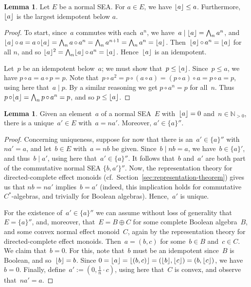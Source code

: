 \documentclass[a4paper, onecolumn, accepted=2020-12-22]{quantumarticle}
\DeclarePairedDelimiter{\floor}{\lfloor}{\rfloor}
\newcommand{\N}{\mathbb{N}}
\newcommand{\mult}{\mathop{\circ}}
\newcommand{\commu}{\mathrel{\lvert}}
\newcounter{counter}
\theoremstyle{definition}
\newtheorem{lemma}[counter]{Lemma}
\begin{document}
\begin{lemma}
    Let $E$ be a normal SEA. For $a\in E$, we have $\floor{a} \leq a$. Furthermore, $\floor{a}$ is the largest idempotent below $a$.
\end{lemma}
\begin{proof}
  To start, 
  since~$a$ commutes with each~$a^n$,
  we have~$a \commu  \floor{a} = \bigwedge_n a^n$,
  and $\floor{a}\mult a = a\mult \floor{a} = \bigwedge_n a\mult a^n 
  = \bigwedge_n a^{n+1}
    = \bigwedge_n a^n = \floor{a}$.
Then~$\floor{a}\mult a^n = \floor{a}$ for all $n$,
  and so $\floor{a}^2 = \bigwedge_n \floor{a} \mult a^n = \floor{a}$.
Hence~$\floor{a}$ is an idempotent.

Let~$p$ be an idempotent below~$a$;  we must show that~$p\leq \floor{a}$.
Since~$p\leq a$, we have $p\mult a = a\mult p=  p$.
Note that~$p\mult a^2 = p\mult(a\mult a)=(p\mult a)\mult a=p\mult a=p$,
using here that~$a\commu p$. By a similar reasoning
we get $p\mult a^n =p$ for all~$n$.
  Thus~$p\mult \floor{a} = \bigwedge_n p\mult a^n 
	= p$, and so $p\leq \floor{a}$.
\end{proof}

\begin{lemma}\label{lem:uniquedivision}
Given an element~$a$ of a normal SEA~$E$ with~$\floor{a}=0$
and~$n\in \N_{>0}$,
there is a unique~$a'\in E$ with~$a=na'$.
  Moreover, $a'\in \{a\}''$.
\end{lemma}
\begin{proof}
Concerning uniqueness, suppose for now that there is an~$a'\in \{a\}''$
with~$na'=a$, and let~$b\in E$ with~$a=nb$ be given.
Since~$b\commu nb=a$, we have~$b\in \{a\}'$,
  and thus~$b\commu a'$, using here that~$a'\in \{a\}''$.
It follows that~$b$ and~$a'$ are both part
  of the commutative normal SEA  $\{b,a'\}''$.
Now,
the representation theory for directed-complete effect monoids
(cf.~Section~\ref{sec:representation-theorem})
gives us that
  $nb=na'$ implies~$b=a'$ (indeed, this implication
  holds for commutative $C^*$-algebras,
  and trivially for Boolean algebras). Hence,~$a'$ is unique.

For the existence of~$a'\in\{a\}''$ 
we can assume without loss of generality that~$E=\{a\}''$,
and, moreover,
that~$E = B\oplus C$
for some complete Boolean algebra~$B$,
and some convex normal effect monoid~$C$,
again by the representation theory for directed-complete effect monoids.
  Then~$a=(b,c)$ for some~$b\in B$ and~$c\in C$.
  We claim that~$b=0$.
  For this, note that~$b$ must be an idempotent since~$B$ is Boolean, 
  and so~$\floor{b}=b$.
Since $0=\floor{a}=\floor{(b,c)}=(\floor{b},\floor{c})=(b,\floor{c})$,
we have~$b=0$.
Finally, define~$a':=(0,\frac{1}{n}\cdot c)$,
  using here that~$C$ is convex, and observe that~$na'=a$.
\end{proof}
\end{document}
